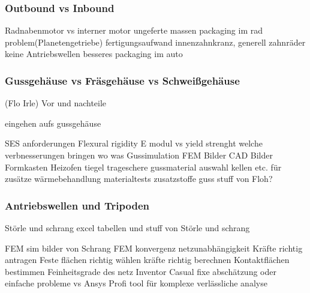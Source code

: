 \subsubsection{Outbound vs Inbound}
Radnabenmotor vs interner motor 
	ungeferte massen
	packaging im rad problem(Planetengetriebe) fertigungsaufwand innenzahnkranz, generell zahnräder
	keine Antriebswellen
	besseres packaging im auto

\subsubsection{Gussgehäuse vs Fräsgehäuse vs Schweißgehäuse} (Flo Irle)
Vor und nachteile

eingehen aufs gussgehäuse

SES anforderungen
Flexural rigidity
E modul vs yield strenght welche verbnesserungen bringen wo was
Gussimulation
FEM Bilder
CAD Bilder
Formkasten
Heizofen
tiegel
trageschere
gussmaterial auswahl
kellen etc. für zusätze
wärmebehandlung
materialtests
zusatzstoffe guss
stuff von Floh?


\subsubsection{Antriebswellen und Tripoden} Störle und schrang
excel tabellen und stuff von Störle und schrang

FEM sim bilder von Schrang
FEM konvergenz
netzunabhängigkeit
Kräfte richtig antragen
Feste flächen richtig wählen
kräfte richtig berechnen
Kontaktflächen bestimmen
Feinheitsgrade des netz
Inventor Casual fixe abschätzung oder einfache probleme vs Ansys Profi tool für komplexe verlässliche analyse
